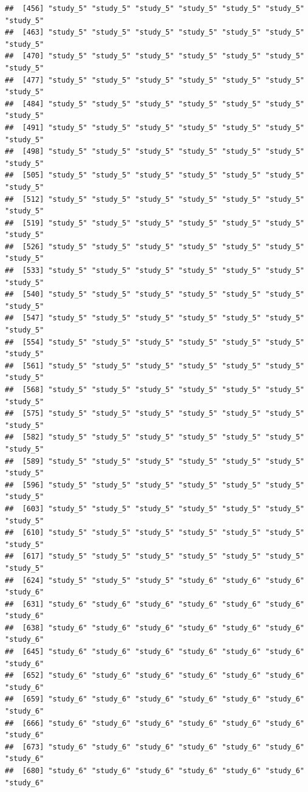 \documentclass[
  american,
  man,floatsintext]{apa7}
\begin{document}
\begin{verbatim}
##  [456] "study_5" "study_5" "study_5" "study_5" "study_5" "study_5" "study_5"
##  [463] "study_5" "study_5" "study_5" "study_5" "study_5" "study_5" "study_5"
##  [470] "study_5" "study_5" "study_5" "study_5" "study_5" "study_5" "study_5"
##  [477] "study_5" "study_5" "study_5" "study_5" "study_5" "study_5" "study_5"
##  [484] "study_5" "study_5" "study_5" "study_5" "study_5" "study_5" "study_5"
##  [491] "study_5" "study_5" "study_5" "study_5" "study_5" "study_5" "study_5"
##  [498] "study_5" "study_5" "study_5" "study_5" "study_5" "study_5" "study_5"
##  [505] "study_5" "study_5" "study_5" "study_5" "study_5" "study_5" "study_5"
##  [512] "study_5" "study_5" "study_5" "study_5" "study_5" "study_5" "study_5"
##  [519] "study_5" "study_5" "study_5" "study_5" "study_5" "study_5" "study_5"
##  [526] "study_5" "study_5" "study_5" "study_5" "study_5" "study_5" "study_5"
##  [533] "study_5" "study_5" "study_5" "study_5" "study_5" "study_5" "study_5"
##  [540] "study_5" "study_5" "study_5" "study_5" "study_5" "study_5" "study_5"
##  [547] "study_5" "study_5" "study_5" "study_5" "study_5" "study_5" "study_5"
##  [554] "study_5" "study_5" "study_5" "study_5" "study_5" "study_5" "study_5"
##  [561] "study_5" "study_5" "study_5" "study_5" "study_5" "study_5" "study_5"
##  [568] "study_5" "study_5" "study_5" "study_5" "study_5" "study_5" "study_5"
##  [575] "study_5" "study_5" "study_5" "study_5" "study_5" "study_5" "study_5"
##  [582] "study_5" "study_5" "study_5" "study_5" "study_5" "study_5" "study_5"
##  [589] "study_5" "study_5" "study_5" "study_5" "study_5" "study_5" "study_5"
##  [596] "study_5" "study_5" "study_5" "study_5" "study_5" "study_5" "study_5"
##  [603] "study_5" "study_5" "study_5" "study_5" "study_5" "study_5" "study_5"
##  [610] "study_5" "study_5" "study_5" "study_5" "study_5" "study_5" "study_5"
##  [617] "study_5" "study_5" "study_5" "study_5" "study_5" "study_5" "study_5"
##  [624] "study_5" "study_5" "study_5" "study_6" "study_6" "study_6" "study_6"
##  [631] "study_6" "study_6" "study_6" "study_6" "study_6" "study_6" "study_6"
##  [638] "study_6" "study_6" "study_6" "study_6" "study_6" "study_6" "study_6"
##  [645] "study_6" "study_6" "study_6" "study_6" "study_6" "study_6" "study_6"
##  [652] "study_6" "study_6" "study_6" "study_6" "study_6" "study_6" "study_6"
##  [659] "study_6" "study_6" "study_6" "study_6" "study_6" "study_6" "study_6"
##  [666] "study_6" "study_6" "study_6" "study_6" "study_6" "study_6" "study_6"
##  [673] "study_6" "study_6" "study_6" "study_6" "study_6" "study_6" "study_6"
##  [680] "study_6" "study_6" "study_6" "study_6" "study_6" "study_6" "study_6"

\end{verbatim}
\end{document}
